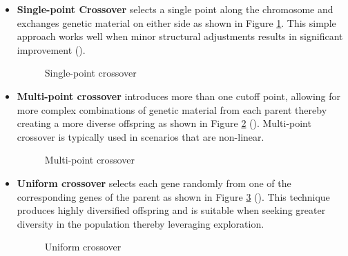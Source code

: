 \begin{itemize}
	\item \textbf{Single-point Crossover} selects a single point along the chromosome and exchanges genetic material on either side as shown in Figure \ref{fig:singlepoint}. This simple approach works well when minor structural adjustments results in significant improvement (\cite{intelligentOptimization}).
	
	\begin{figure}[H] %
		\centering %
		\caption{Single-point crossover}
		\label{fig:singlepoint} %
	\end{figure}

	\item \textbf{Multi-point crossover} introduces more than one cutoff point, allowing for more complex combinations of genetic material from each parent thereby creating a more diverse offspring as shown in Figure \ref{fig:multipoint} (\cite{crossoverMethods}). Multi-point crossover is typically used in scenarios that are non-linear. 
	
	\begin{figure}[H] %
		\centering %
		\caption{Multi-point crossover}
		\label{fig:multipoint} %
	\end{figure}

	\item \textbf{Uniform crossover} selects each gene randomly from one of the corresponding genes of the parent as shown in Figure \ref{fig:uniform} (\cite{crossoverMethods}). This technique produces highly diversified offspring and is suitable when seeking greater diversity in the population thereby leveraging exploration.
	
	\begin{figure}[th] %
		\centering %
		\caption{Uniform crossover}
		\label{fig:uniform} %
	\end{figure}
\end{itemize}

